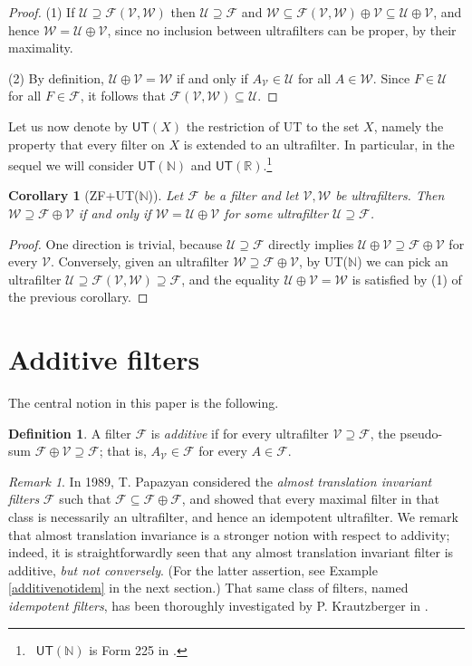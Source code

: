 \documentclass{amsart}
\newtheorem{corollary}[theorem]{Corollary}
\theoremstyle{definition}
\newtheorem{definition}[theorem]{Definition}
\theoremstyle{remark}
\newtheorem{remark}[theorem]{Remark}
\def\F{\mathscr{F}}
\def\U{\mathscr{U}}
\def\V{\mathscr{V}}
\def\W{\mathscr{W}}
\def\N{\mathbb{N}}
\def\R{\mathbb{R}}
\begin{document}
\begin{proof}
(1) If $\U\supseteq\F(\V,\W)$ then $\U\supseteq\F$ and
$\W\subseteq\F(\V,\W)\oplus\V\subseteq\U\oplus\V$,
and hence $\W=\U\oplus\V$, since no inclusion between
ultrafilters can be proper, by their maximality.

(2) By definition, $\U\oplus\V=\W$ if and only if $A_\V\in\U$ for all $A\in\W$.
Since $F\in\U$ for all $F\in\F$, it follows that $\F(\V,\W)\subseteq\U$.
\end{proof}


Let us now denote by $\textsf{UT}(X)$ the restriction of
\textsf{UT} to the set $X$, namely the property that
every filter on $X$ is extended to an ultrafilter.
In particular, in the sequel we will consider
$\textsf{UT}(\N)$ and $\textsf{UT}(\R)$.\footnote
{~$\textsf{UT}(\N)$ is Form 225 in \cite{hr}.}

\begin{corollary}[\textsf{ZF+UT}($\N$)]\label{cor2}
Let $\F$ be a filter and let $\V,\W$ be ultrafilters.
Then $\W\supseteq\F\oplus\V$ if and only if
$\W=\U\oplus\V$ for some ultrafilter $\U\supseteq\F$.
\end{corollary}

\begin{proof}
One direction is trivial, because $\U\supseteq\F$
directly implies $\U\oplus\V\supseteq\F\oplus\V$ for every $\V$.
Conversely, given an ultrafilter
$\W\supseteq\F\oplus\V$, by \textsf{UT}($\N$) we can
pick an ultrafilter $\U\supseteq\F(\V,\W)\supseteq\F$,
and the equality $\U\oplus\V=\W$ is satisfied by (1) of
the previous corollary.
\end{proof}

\medskip
\section{Additive filters}\label{sec-additive}

The central notion in this paper is the following.

\begin{definition}
A filter $\F$ is \emph{additive}
if for every ultrafilter $\V\supseteq\F$,
the pseudo-sum
$\F\oplus\V\supseteq\F$; that is, $A_\V\in\F$
for every $A\in\F$.
\end{definition}


\begin{remark}
In 1989, T. Papazyan \cite{p} considered the 
\emph{almost translation invariant filters} $\F$ such that 
$\F\subseteq\F\oplus\F$, and showed that every maximal filter 
in that class is necessarily an ultrafilter, and hence an idempotent ultrafilter. 
We remark that almost translation invariance is a stronger notion with
respect to addivity; indeed, it is straightforwardly seen that any 
almost translation invariant filter is additive, 
\emph{but not conversely}. (For the latter assertion, see
Example \ref{additivenotidem} in the next section.)
That same class of filters, named \emph{idempotent filters},
has been thoroughly investigated by P. Krautzberger in \cite{k}.
\end{remark}
\end{document}

